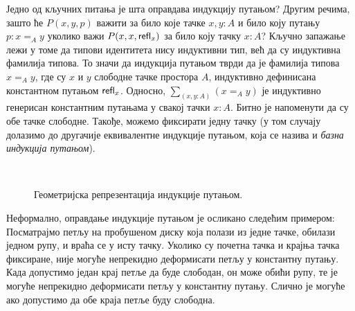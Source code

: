 \documentclass[12pt,oneside]{memoir}
\begin{document}
Једно од кључних питања је шта оправдава индукцију путањом? Другим речима, зашто ће $P(x, y, p)$ важити за било које тачке $x, y : A$ и било коју путању $p: x =_A y$ уколико важи $P(x, x, \mathsf{refl}_{x})$ за било коју тачку $x : A$? Кључно запажање лежи у томе да типови идентитета нису индуктивни тип, већ да су индуктивна фамилија типова. То значи да индукција путањом тврди да је фамилија типова $x =_A y$, где су $x$ и $y$ слободне тачке простора $A$, индуктивно дефинисана константном путањом $\mathsf{refl}_{x}$. Односно, $\sum_{(x, y : A)} (x =_A y)$ је индуктивно генерисан константним путањама у свакој тачки $x : A$. Битно је напоменути да су обе тачке слободне. Такође, можемо фиксирати једну тачку (у том случају долазимо до другачије еквивалентне индукције путањом, која се назива и \emph{базна индукција путањом}).  

\begin{figure}[!ht]
    \centering\
    \label{fig:path_ind}
    \caption{Геометријска репрезентација индукције путањом.}
\end{figure}

Неформално, оправдање индукције путањом је осликано следећим примером: Посматрајмо петљу на пробушеном диску која полази из једне тачке, обилази једном рупу, и враћа се у исту тачку. Уколико су почетна тачка и крајња тачка фиксиране, није могуће непрекидно деформисати петљу у константну путању. Када допустимо један крај петље да буде слободан, он може обићи рупу, те је могуће непрекидно деформисати петљу у константну путању. Слично је могуће ако допустимо да обе краја петље буду слободна. 
\end{document}
